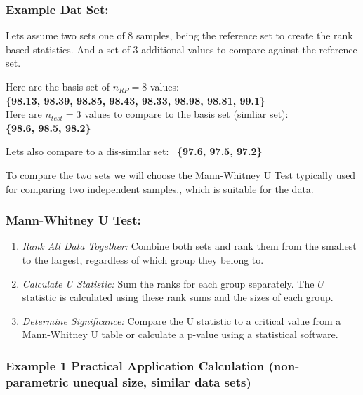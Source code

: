 \documentclass[
  12pt,
  a4paper,
]{article}
\providecommand{\tightlist}{%
  \setlength{\itemsep}{0pt}\setlength{\parskip}{0pt}}
\numberwithin{equation}{section}
\theoremstyle{plain}
\theoremstyle{definition}
\theoremstyle{remark}
\theoremstyle{note}
\begin{document}
\hypertarget{example-dat-set}{%
\subsubsection{Example Dat Set:}\label{example-dat-set}}

Lets assume two sets one of 8 samples, being the reference set to create
the rank based statistics. And a set of 3 additional values to compare
against the reference set.

Here are the basis set of \(n_{RP}=8\) values:\\
\textbf{\{98.13, 98.39, 98.85, 98.43, 98.33, 98.98, 98.81, 99.1\}}\\
Here are \(n_{test}=3\) values to compare to the basis set (simliar
set):\\
\textbf{\{98.6, 98.5, 98.2\}}~

Lets also compare to a dis-similar set:~ \textbf{\{97.6, 97.5, 97.2\}}~

To compare the two sets we will choose the Mann-Whitney U Test typically
used for comparing two independent samples., which is suitable for the
data.

\hypertarget{mann-whitney-u-test}{%
\subsubsection{Mann-Whitney U Test:}\label{mann-whitney-u-test}}

\begin{enumerate}
\def\labelenumi{\arabic{enumi}.}
\tightlist
\item
  \emph{Rank All Data Together:} Combine both sets and rank them from
  the smallest to the largest, regardless of which group they belong to.
\item
  \emph{Calculate U Statistic:} Sum the ranks for each group separately.
  The \(U\) statistic is calculated using these rank sums and the sizes
  of each group.
\item
  \emph{Determine Significance:} Compare the U statistic to a critical
  value from a Mann-Whitney U table or calculate a p-value using a
  statistical software.
\end{enumerate}

\newpage

\hypertarget{example-1-practical-application-calculation-non-parametric-unequal-size-similar-data-sets}{%
\subsubsection{Example 1 Practical Application Calculation
(non-parametric unequal size, similar data
sets)}\label{example-1-practical-application-calculation-non-parametric-unequal-size-similar-data-sets}}
\end{document}
